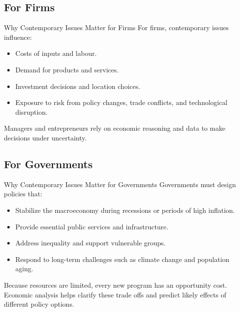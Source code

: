 \documentclass[aspectratio=169]{beamer}
\begin{document}
\subsection{For Firms}

\begin{frame}{Why Contemporary Issues Matter for Firms}
  \transfade
  For firms, contemporary issues influence:
  \begin{itemize}
    \item Costs of inputs and labour.
    \item Demand for products and services.
    \item Investment decisions and location choices.
    \item Exposure to risk from policy changes, trade conflicts, and technological disruption.
  \end{itemize}

  \vspace{0.3cm}
  Managers and entrepreneurs rely on economic reasoning and data to make decisions under
  uncertainty.
\end{frame}

\subsection{For Governments}

\begin{frame}{Why Contemporary Issues Matter for Governments}
  \transfade
  Governments must design policies that:
  \begin{itemize}
    \item Stabilize the macroeconomy during recessions or periods of high inflation.
    \item Provide essential public services and infrastructure.
    \item Address inequality and support vulnerable groups.
    \item Respond to long-term challenges such as climate change and population aging.
  \end{itemize}

  \vspace{0.3cm}
  Because resources are limited, every new program has an opportunity cost. Economic analysis
  helps clarify these trade offs and predict likely effects of different policy options.
\end{frame}

\end{document}
